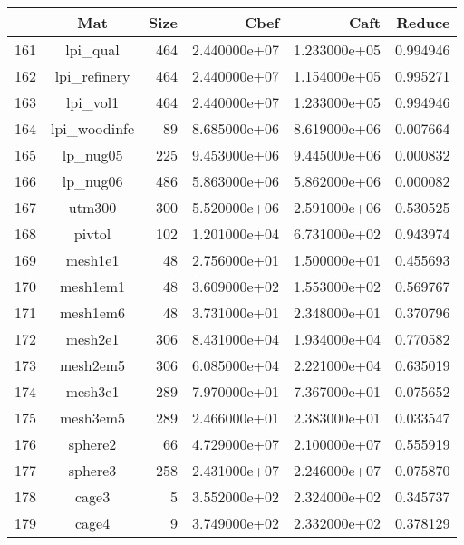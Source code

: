 \documentclass[8pt]{report}
\begin{document}
	\begin{table*}
	\center
		\begin{tabular}{|l|c|r|r|r|r|}
\toprule
{} &                      Mat &  Size &          Cbef &          Caft &    Reduce \\
\midrule
161 &                 lpi\_qual &   464 &  2.440000e+07 &  1.233000e+05 &  0.994946 \\
162 &             lpi\_refinery &   464 &  2.440000e+07 &  1.154000e+05 &  0.995271 \\
163 &                 lpi\_vol1 &   464 &  2.440000e+07 &  1.233000e+05 &  0.994946 \\
164 &             lpi\_woodinfe &    89 &  8.685000e+06 &  8.619000e+06 &  0.007664 \\
165 &                 lp\_nug05 &   225 &  9.453000e+06 &  9.445000e+06 &  0.000832 \\
166 &                 lp\_nug06 &   486 &  5.863000e+06 &  5.862000e+06 &  0.000082 \\
167 &                   utm300 &   300 &  5.520000e+06 &  2.591000e+06 &  0.530525 \\
168 &                   pivtol &   102 &  1.201000e+04 &  6.731000e+02 &  0.943974 \\
169 &                  mesh1e1 &    48 &  2.756000e+01 &  1.500000e+01 &  0.455693 \\
170 &                 mesh1em1 &    48 &  3.609000e+02 &  1.553000e+02 &  0.569767 \\
171 &                 mesh1em6 &    48 &  3.731000e+01 &  2.348000e+01 &  0.370796 \\
172 &                  mesh2e1 &   306 &  8.431000e+04 &  1.934000e+04 &  0.770582 \\
173 &                 mesh2em5 &   306 &  6.085000e+04 &  2.221000e+04 &  0.635019 \\
174 &                  mesh3e1 &   289 &  7.970000e+01 &  7.367000e+01 &  0.075652 \\
175 &                 mesh3em5 &   289 &  2.466000e+01 &  2.383000e+01 &  0.033547 \\
176 &                  sphere2 &    66 &  4.729000e+07 &  2.100000e+07 &  0.555919 \\
177 &                  sphere3 &   258 &  2.431000e+07 &  2.246000e+07 &  0.075870 \\
178 &                    cage3 &     5 &  3.552000e+02 &  2.324000e+02 &  0.345737 \\
179 &                    cage4 &     9 &  3.749000e+02 &  2.332000e+02 &  0.378129 \\

\end{tabular}
\end{table*}
\end{document}
